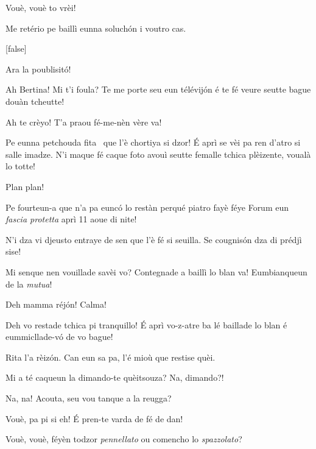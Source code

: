 \begin{drama}
\Pascalspeaks {} Vouè, vouè to vrèi!

\DzeudzoSenliquerspeaks Me retério pe baillì eunna soluchón i voutro cas.

[false]



\Ritaspeaks {} Ara la poublisitó!


\Tobiespeaks {} Ah Bertina! Mi t'i foula? Te me porte seu eun télévij\'on é te fé veure seutte bague douàn tcheutte!

\Bertinaspeaks {} Ah te crèyo! T’a praou fé-me-nèn vère va! 

\Tobiespeaks Pe eunna petchouda fita \fitaa\ que l’è chortiya si dzor! É aprì se vèi pa ren d’atro si salle imadze. N’i maque fé caque foto avouì seutte femalle tchica plèizente, voualà lo totte!

\Pascalspeaks {} Plan plan!

\Bertinaspeaks Pe fourteun-a que n’a pa eunc\'o lo restàn perqué piatro fayè féye Forum eun \textit{fascia protetta} aprì 11 aoue di nite!

\Eumprezeospeaks N’i dza vi djeusto entraye de sen que l’è fé si seuilla. Se cougnisón dza di prédjì sise!

\Tobiespeaks Mi senque nen vouillade savèi vo? Contegnade a baillì lo blan va! Eumbianqueun de la \textit{mutua}!

\Simonspeaks Deh mamma réjón! Calma!

\Ritaspeaks {} Deh vo restade tchica pi tranquillo!  É aprì vo-z-atre ba lé baillade lo blan é eum\-mi\-clla\-de-vó de vo bague!

\Simonspeaks Rita l’a rèizón. Can eun sa pa, l’é mioù que restise quèi.

\Eumprezeospeaks Mi a té caqueun la dimando-te quèitsouza? Na, dimando?!

\Simonspeaks Na, na! Acouta, seu vou tanque a la reugga?

\Eumprezeospeaks Vouè, pa pi si eh! É pren-te varda de fé de dan!

\Simonspeaks Vouè, vouè, féyèn todzor \textit{pennellato} ou comencho lo \textit{spazzolato}?


\end{drama}
